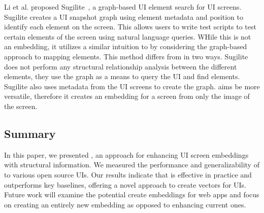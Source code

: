 Li et al. proposed Sugilite~\cite{Li20-suglite}, a graph-based UI element search for UI screens. Sugilite creates a UI snapshot graph using element metadata and position to identify each element on the screen. This allows users to write test scripts to test certain elements of the screen using natural language queries. WHile this is not an embedding, it utilizes a similar intuition to \FRAME by considering the graph-based approach to mapping elements. This method differs from \FRAME in two ways. Sugilite does not perform any structural relationship analysis between the different elements, they use the graph as a means to query the UI and find elements. Sugilite also uses metadata from the UI screens to create the graph. \FRAME aims be more versatile, therefore it creates an embedding for a screen from only the image of the screen. 

\subsection{Summary}
In this paper, we presented \FRAME, an approach for enhancing UI screen embeddings with structural information. We measured the performance and generalizability of \FRAME to various open source UIs. Our results indicate that \FRAME is effective in practice and outperforms key baselines, offering a novel approach to create vectors for UIs. Future work will examine the potential create embeddings for web apps and focus on creating an entirely new embedding as opposed to enhancing current ones.











